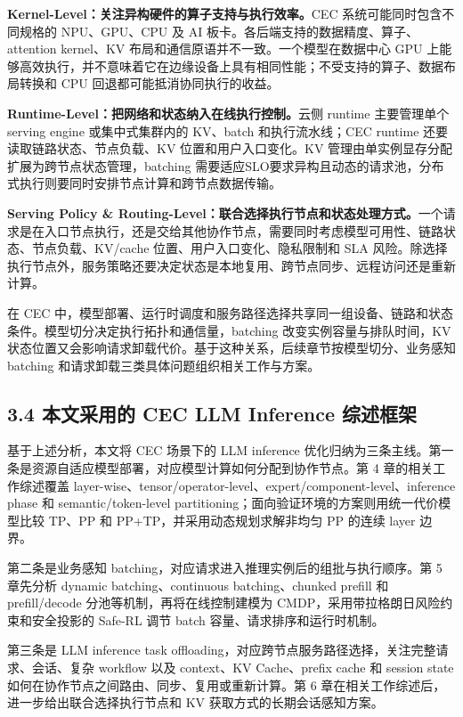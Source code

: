 \textbf{Kernel-Level：关注异构硬件的算子支持与执行效率。}CEC 系统可能同时包含不同规格的 NPU、GPU、CPU 及 AI 板卡。各后端支持的数据精度、算子、attention kernel、KV 布局和通信原语并不一致。一个模型在数据中心 GPU 上能够高效执行，并不意味着它在边缘设备上具有相同性能；不受支持的算子、数据布局转换和 CPU 回退都可能抵消协同执行的收益。

\textbf{Runtime-Level：把网络和状态纳入在线执行控制。}云侧 runtime 主要管理单个 serving engine 或集中式集群内的 KV、batch 和执行流水线；CEC runtime 还要读取链路状态、节点负载、KV 位置和用户入口变化。KV 管理由单实例显存分配扩展为跨节点状态管理，batching 需要适应SLO要求异构且动态的请求池，分布式执行则要同时安排节点计算和跨节点数据传输。

\textbf{Serving Policy \& Routing-Level：联合选择执行节点和状态处理方式。}一个请求是在入口节点执行，还是交给其他协作节点，需要同时考虑模型可用性、链路状态、节点负载、KV/cache 位置、用户入口变化、隐私限制和 SLA 风险。除选择执行节点外，服务策略还要决定状态是本地复用、跨节点同步、远程访问还是重新计算。

在 CEC 中，模型部署、运行时调度和服务路径选择共享同一组设备、链路和状态条件。模型切分决定执行拓扑和通信量，batching 改变实例容量与排队时间，KV 状态位置又会影响请求卸载代价。基于这种关系，后续章节按模型切分、业务感知 batching 和请求卸载三类具体问题组织相关工作与方案。

\subsection*{3.4 本文采用的 CEC LLM Inference 综述框架}

基于上述分析，本文将 CEC 场景下的 LLM inference 优化归纳为三条主线。第一条是资源自适应模型部署，对应模型计算如何分配到协作节点。第 4 章的相关工作综述覆盖 layer-wise、tensor/operator-level、expert/component-level、inference phase 和 semantic/token-level partitioning；面向验证环境的方案则用统一代价模型比较 TP、PP 和 PP+TP，并采用动态规划求解非均匀 PP 的连续 layer 边界。

第二条是业务感知 batching，对应请求进入推理实例后的组批与执行顺序。第 5 章先分析 dynamic batching、continuous batching、chunked prefill 和 prefill/decode 分池等机制，再将在线控制建模为 CMDP，采用带拉格朗日风险约束和安全投影的 Safe-RL 调节 batch 容量、请求排序和运行时机制。

第三条是 LLM inference task offloading，对应跨节点服务路径选择，关注完整请求、会话、复杂 workflow 以及 context、KV Cache、prefix cache 和 session state 如何在协作节点之间路由、同步、复用或重新计算。第 6 章在相关工作综述后，进一步给出联合选择执行节点和 KV 获取方式的长期会话感知方案。

